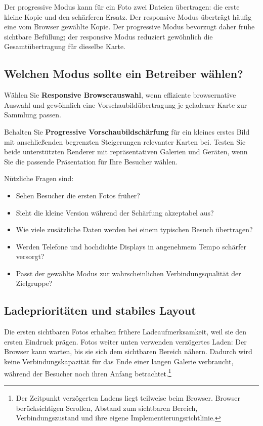\documentclass[11pt,a4paper]{article}
\newcommand{\ui}[1]{\textbf{#1}}
\begin{document}
Der progressive Modus kann für ein Foto zwei Dateien übertragen: die erste
kleine Kopie und den schärferen Ersatz. Der responsive Modus überträgt häufig
eine vom Browser gewählte Kopie. Der progressive Modus bevorzugt daher frühe
sichtbare Befüllung; der responsive Modus reduziert gewöhnlich die
Gesamtübertragung für dieselbe Karte.

\subsection{Welchen Modus sollte ein Betreiber wählen?}

Wählen Sie \ui{Responsive Browserauswahl}, wenn effiziente browsernative Auswahl
und gewöhnlich eine Vorschaubildübertragung je geladener Karte zur Sammlung
passen.

Behalten Sie \ui{Progressive Vorschaubildschärfung} für ein kleines erstes Bild
mit anschließenden begrenzten Steigerungen relevanter Karten bei. Testen Sie
beide unterstützten Renderer mit repräsentativen Galerien und Geräten, wenn Sie
die passende Präsentation für Ihre Besucher wählen.

Nützliche Fragen sind:

\begin{itemize}
  \item Sehen Besucher die ersten Fotos früher?
  \item Sieht die kleine Version während der Schärfung akzeptabel aus?
  \item Wie viele zusätzliche Daten werden bei einem typischen Besuch
  übertragen?
  \item Werden Telefone und hochdichte Displays in angenehmem Tempo schärfer
  versorgt?
  \item Passt der gewählte Modus zur wahrscheinlichen Verbindungsqualität der
  Zielgruppe?
\end{itemize}

\subsection{Ladeprioritäten und stabiles Layout}

Die ersten sichtbaren Fotos erhalten frühere Ladeaufmerksamkeit, weil sie den
ersten Eindruck prägen. Fotos weiter unten verwenden verzögertes Laden: Der
Browser kann warten, bis sie sich dem sichtbaren Bereich nähern. Dadurch wird
keine Verbindungskapazität für das Ende einer langen Galerie verbraucht, während
der Besucher noch ihren Anfang betrachtet.\footnote{Der Zeitpunkt verzögerten
Ladens liegt teilweise beim Browser. Browser berücksichtigen Scrollen, Abstand
zum sichtbaren Bereich, Verbindungszustand und ihre eigene
Implementierungsrichtlinie.}
\end{document}
